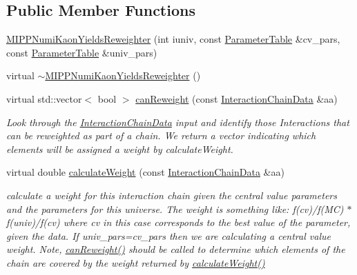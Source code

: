 \subsection*{Public Member Functions}
\begin{DoxyCompactItemize}
\item 
\hyperlink{class_neutrino_flux_reweight_1_1_m_i_p_p_numi_kaon_yields_reweighter_ae0efdd82f42923c1ffdd2a7f8d4213e5}{M\-I\-P\-P\-Numi\-Kaon\-Yields\-Reweighter} (int iuniv, const \hyperlink{class_neutrino_flux_reweight_1_1_parameter_table}{Parameter\-Table} \&cv\-\_\-pars, const \hyperlink{class_neutrino_flux_reweight_1_1_parameter_table}{Parameter\-Table} \&univ\-\_\-pars)
\item 
virtual \hyperlink{class_neutrino_flux_reweight_1_1_m_i_p_p_numi_kaon_yields_reweighter_a9d49b5825c71d0ac29db896934f5cb77}{$\sim$\-M\-I\-P\-P\-Numi\-Kaon\-Yields\-Reweighter} ()
\item 
virtual std\-::vector$<$ bool $>$ \hyperlink{class_neutrino_flux_reweight_1_1_m_i_p_p_numi_kaon_yields_reweighter_a6ca3bcd0846fd600f51988a2e396aafb}{can\-Reweight} (const \hyperlink{class_neutrino_flux_reweight_1_1_interaction_chain_data}{Interaction\-Chain\-Data} \&aa)
\begin{DoxyCompactList}\small\item\em Look through the \hyperlink{class_neutrino_flux_reweight_1_1_interaction_chain_data}{Interaction\-Chain\-Data} input and identify those Interactions that can be reweighted as part of a chain. We return a vector indicating which elements will be assigned a weight by calculate\-Weight. \end{DoxyCompactList}\item 
virtual double \hyperlink{class_neutrino_flux_reweight_1_1_m_i_p_p_numi_kaon_yields_reweighter_ad9503e13848e30f432c297ed70e24134}{calculate\-Weight} (const \hyperlink{class_neutrino_flux_reweight_1_1_interaction_chain_data}{Interaction\-Chain\-Data} \&aa)
\begin{DoxyCompactList}\small\item\em calculate a weight for this interaction chain given the central value parameters and the parameters for this universe. The weight is something like\-: f(cv)/f(M\-C) $\ast$ f(univ)/f(cv) where cv in this case corresponds to the best value of the parameter, given the data. If univ\-\_\-pars=cv\-\_\-pars then we are calculating a central value weight. Note, \hyperlink{class_neutrino_flux_reweight_1_1_m_i_p_p_numi_kaon_yields_reweighter_a6ca3bcd0846fd600f51988a2e396aafb}{can\-Reweight()} should be called to determine which elements of the chain are covered by the weight returned by \hyperlink{class_neutrino_flux_reweight_1_1_m_i_p_p_numi_kaon_yields_reweighter_ad9503e13848e30f432c297ed70e24134}{calculate\-Weight()} \end{DoxyCompactList}\end{DoxyCompactItemize}

